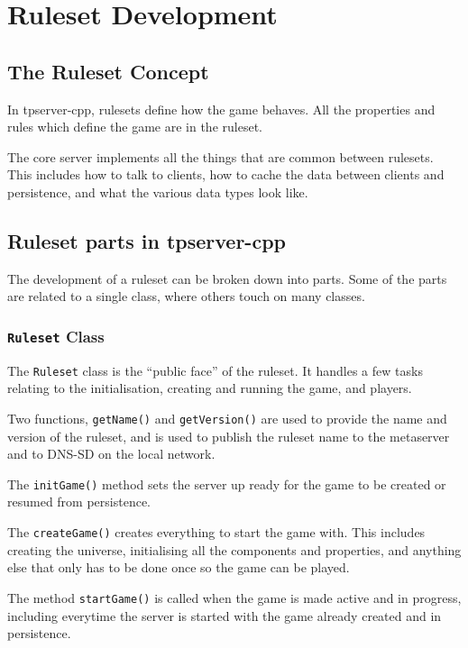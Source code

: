 \documentclass[a4paper,11pt]{report}
\newcommand{\codename}[1]{\texttt{#1}}
\begin{document}
\part{Ruleset Development}
\label{part:ruleset-dev}

\chapter{The Ruleset Concept}
\label{chap:ruleset-concept}

In tpserver-cpp, rulesets define how the game behaves.  All the properties and rules which define the game are in the ruleset.

The core server implements all the things that are common between rulesets. This includes how to talk to clients, how to cache the data between clients and persistence, and what the various data types look like.



\chapter{Ruleset parts in tpserver-cpp}
\label{chap:ruleset-parts}

The development of a ruleset can be broken down into parts. Some of the parts are related to a single class, where others touch on many classes.

\section{\codename{Ruleset} Class}
\label{sec:ruleset-class}

The \codename{Ruleset} class is the ``public face'' of the ruleset. It handles a few tasks relating to the initialisation, creating and running the game, and players.

Two functions, \codename{getName()} and \codename{getVersion()} are used to provide the name and version of the ruleset, and is used to publish the ruleset name to the metaserver and to DNS-SD on the local network.

The \codename{initGame()} method sets the server up ready for the game to be created or resumed from persistence.

The \codename{createGame()} creates everything to start the game with. This includes creating the universe, initialising all the components and properties, and anything else that only has to be done once so the game can be played.

The method \codename{startGame()} is called when the game is made active and in progress, including everytime the server is started with the game already created and in persistence.
\end{document}
